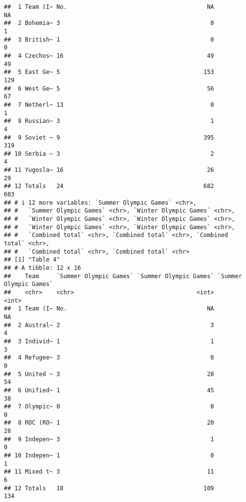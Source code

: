 \documentclass[
]{article}
\begin{document}
\begin{verbatim}
##  1 Team (I~ No.                                        NA                     NA
##  2 Bohemia~ 3                                           0                      1
##  3 British~ 1                                           0                      0
##  4 Czechos~ 16                                         49                     49
##  5 East Ge~ 5                                         153                    129
##  6 West Ge~ 5                                          56                     67
##  7 Netherl~ 13                                          0                      1
##  8 Russian~ 3                                           1                      4
##  9 Soviet ~ 9                                         395                    319
## 10 Serbia ~ 3                                           2                      4
## 11 Yugosla~ 16                                         26                     29
## 12 Totals   24                                        682                    603
## # i 12 more variables: `Summer Olympic Games` <chr>,
## #   `Summer Olympic Games` <chr>, `Winter Olympic Games` <chr>,
## #   `Winter Olympic Games` <chr>, `Winter Olympic Games` <chr>,
## #   `Winter Olympic Games` <chr>, `Winter Olympic Games` <chr>,
## #   `Combined total` <chr>, `Combined total` <chr>, `Combined total` <chr>,
## #   `Combined total` <chr>, `Combined total` <chr>
## [1] "Table 4"
## # A tibble: 12 x 16
##    Team     `Summer Olympic Games` `Summer Olympic Games` `Summer Olympic Games`
##    <chr>    <chr>                                   <int>                  <int>
##  1 Team (I~ No.                                        NA                     NA
##  2 Austral~ 2                                           3                      4
##  3 Individ~ 1                                           1                      3
##  4 Refugee~ 3                                           0                      0
##  5 United ~ 3                                          28                     54
##  6 Unified~ 1                                          45                     38
##  7 Olympic~ 0                                           0                      0
##  8 ROC (RO~ 1                                          20                     28
##  9 Indepen~ 3                                           1                      0
## 10 Indepen~ 1                                           0                      1
## 11 Mixed t~ 3                                          11                      6
## 12 Totals   18                                        109                    134

\end{verbatim}
\end{document}
